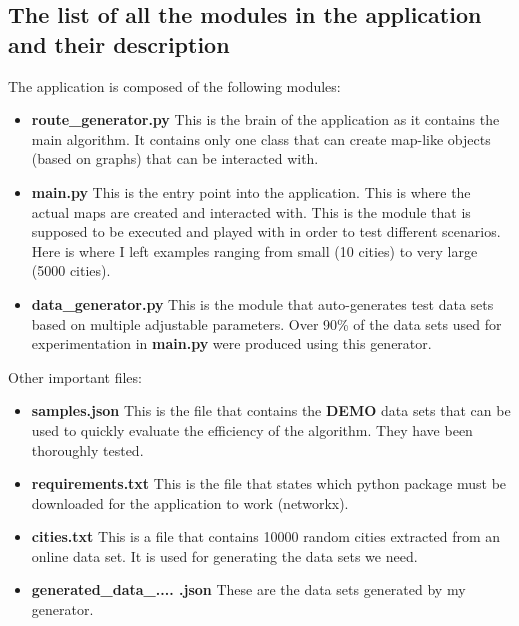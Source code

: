 \documentclass[12pt]{article}
\begin{document}
\subsection{The list of all the modules in the application and their description}
The application is composed of the following modules:
\begin{itemize}
    \item \textbf{route\_generator.py}
    \newline
    This is the brain of the application as it contains the main algorithm. It contains only one class that can create map-like objects (based on graphs) that can be interacted with.
    \item \textbf{main.py}
    \newline
    This is the entry point into the application. This is where the actual maps are created and interacted with. This is the module that is supposed to be executed and played with in order to test different scenarios. Here is where I left examples ranging from small (10 cities) to very large (5000 cities).
    \item \textbf{data\_generator.py}
    \newline
    This is the module that auto-generates test data sets based on multiple adjustable parameters. Over 90\% of the data sets used for experimentation in \textbf{main.py} were produced using this generator.
\end{itemize}

Other important files:
\begin{itemize}
    \item \textbf{samples.json}
    \newline
    This is the file that contains the \textbf{DEMO} data sets that can be used to quickly evaluate the efficiency of the algorithm. They have been thoroughly tested.
    \item \textbf{requirements.txt}
    \newline
    This is the file that states which python package must be downloaded for the application to work (networkx).
    \item \textbf{cities.txt}
    \newline
    This is a file that contains 10000 random cities extracted from an online data set. It is used for generating the data sets we need.
    \item \textbf{generated\_data\_.... .json}
    \newline
    These are the data sets generated by my generator.
\end{itemize}
\end{document}
